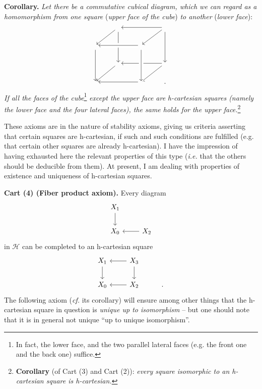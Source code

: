 \documentclass[11pt]{article}
\newcommand{\msp}[1]{\marginpar{\footnotesize [#1]}}
\begin{document}
\noindent\textbf{Corollary.} \textit{Let there be a commutative cubical diagram, which we can regard as a homomorphism from one square} (\textit{upper face of the cube}) \textit{to another} (\textit{lower face}):
\[
\begin{tikzcd}
 & {} \arrow[dl] \arrow[dd] & & {} \arrow[ll] \arrow[dl] \arrow[dd] \\
{} \arrow[dd] & & {} \arrow[ll, crossing over] & \\
 & {} \arrow[dl] & & {} \arrow[ll] \arrow[dl] \\
{} & & {} \arrow[ll] \arrow[from=uu, crossing over] & .
\end{tikzcd}
\]
\textit{If all the faces of the cube}\footnote{In fact, the lower face, and the two parallel lateral faces (e.g. the front one and the back one) suffice.} \textit{except the upper face are} \msp{page 4} \textit{h-cartesian squares (namely the lower face and the four lateral faces), the same holds for the upper face.}\footnote{\textbf{Corollary} (of Cart (3) and Cart (2)): \textit{every square isomorphic to an h-cartesian square is h-cartesian.}}

\noindent These axioms are in the nature of stability axioms, giving us criteria asserting that certain squares are h-cartesian, if such and such conditions are fulfilled (e.g. that certain other squares are already h-cartesian). I have the impression of having exhausted here the relevant properties of this type (\textit{i.e.} that the others should be deducible from them). At present, I am dealing with properties of existence and uniqueness of h-cartesian squares. %

\noindent\textbf{Cart (4) (Fiber product axiom).} Every diagram
\[
\begin{tikzcd}
X_1 \arrow[d] & \\
X_0 & X_2 \arrow[l]
\end{tikzcd}
\]
in $\mathcal{H}$ can be completed to an h-cartesian square
\[
\begin{tikzcd}
X_1 \arrow[d] & X_3 \arrow[l] \arrow[d] & \\
X_0 & X_2 \arrow[l] & .
\end{tikzcd}
\]
The following axiom (\textit{cf.} its corollary) will ensure among other things that the h-cartesian square in question is \textit{unique up to isomorphism} – but one should note that it is in general not unique ``up to unique isomorphism''.
\end{document}
